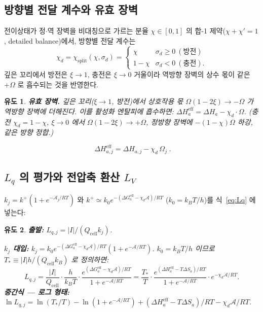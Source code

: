 \documentclass[11pt,a4paper]{article}
\newtheorem*{derivebox}{유도}
\newcommand{\eff}{\mathrm{eff}}
\newcommand{\cell}{\mathrm{cell}}
\begin{document}
\subsection{방향별 전달 계수와 유효 장벽}
전이상태가 정$\cdot$역 장벽을 비대칭으로 가르는 분율 $\chi\in[0,1]$ 의 합-1 제약($\chi+\chi'=1$,
detailed balance)에서, 방향별 전달 계수는
\begin{equation}
\chi_d=\chi_\mathrm{split}(\chi,\sigma_d)=
\begin{cases}\chi & \sigma_d\ge0\ (\text{방전})\\ 1-\chi & \sigma_d<0\ (\text{충전}).\end{cases}
\label{eq:chid}
\end{equation}
깊은 꼬리에서 방전은 $\xi\to1$, 충전은 $\xi\to0$ 거울이라 역방향 장벽의 상수 몫이 같은 $+\Omega$ 로 흡수되는 것을 반영한다.

\begin{derivebox}
\textbf{유효 장벽.} 깊은 꼬리($\xi\to1$, 방전)에서 상호작용 몫 $\Omega(1-2\xi)\to-\Omega$ 가 역방향 장벽에
더해진다. 이를 활성화 엔탈피에 흡수하면: $\Delta H_a^\eff=\Delta H_a-\chi_d\cdot\Omega$. (충전 $\chi_d=1-\chi$,
$\xi\to0$ 에서 $\Omega(1-2\xi)\to+\Omega$, 정방향 장벽에 $-(1-\chi)\Omega$ 하강, 같은 방향 정합.)
\end{derivebox}

\begin{equation}
\boxed{\;\Delta H_{a,j}^\eff=\Delta H_{a,j}-\chi_d\,\Omega_j\;.}
\label{eq:dHeff}
\end{equation}

\subsection{$L_q$ 의 평가와 전압축 환산 $L_V$}
$k_j=k^+(1+e^{-\mathcal A_j/RT})$ 와 $k^+\simeq k_0 e^{-(\Delta G_a^\eff-\chi_d\mathcal A)/RT}$ ($k_0=k_BT/h$)를
식~\eqref{eq:Lq} 에 넣는다:

\begin{derivebox}
\textbf{출발:} $L_{q,j}=|I|/(Q_\cell k_j)$.

\textbf{$k_j$ 대입:} $k_j=k_0 e^{-(\Delta G_a^\eff-\chi_d\mathcal A)/RT}(1+e^{-\mathcal A/RT})$.
$k_0=k_BT/h$ 이므로 $T_*\equiv|I|h/(Q_\cell k_B)$ 로 정의하면:
\begin{equation*}
L_{q,j}=\frac{|I|}{Q_\cell}\cdot\frac{h}{k_BT}\cdot\frac{e^{(\Delta G_a^\eff-\chi_d\mathcal A)/RT}}{1+e^{-\mathcal A/RT}}
=\frac{T_*}{T}\cdot\frac{e^{(\Delta H_a^\eff-T\Delta S_a)/RT}}{1+e^{-\mathcal A/RT}}\cdot e^{-\chi_d\mathcal A/RT}.
\end{equation*}
\textbf{중간식 — 로그 형태:}
$\ln L_{q,j}=\ln(T_*/T)-\ln(1+e^{-\mathcal A/RT})+(\Delta H_a^\eff-T\Delta S_a)/RT-\chi_d\mathcal A/RT$.
\end{derivebox}
\end{document}
